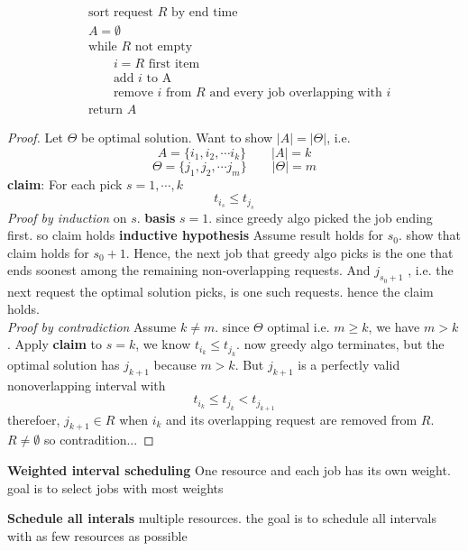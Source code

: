 \documentclass[11pt]{article}
\begin{document}
\begin{example}
\begin{solution}
    \begin{align*}
      &\text{sort request $R$ by end time}\\
      &A = \emptyset\\
      &\text{while $R$ not empty}\\
      &\quad\quad i = R \text{ first item } \\
      &\quad\quad \text{add $i$ to A} \\
      &\quad\quad \text{remove $i$ from $R$ and every job overlapping with $i$}\\
      &\text{return } A
    \end{align*}
    \begin{proof}
      Let $\Theta$ be optimal solution. Want to show $|A| = |\Theta|$, i.e.
      \[
        A = \{ i_1, i_2, \cdots i_k\} \quad \quad |A| = k
      \]
      \[
        \Theta = \{ j_1, j_2, \cdots j_m\} \quad \quad |\Theta| = m
      \]
      \textbf{claim}: For each pick $s = 1, \cdots, k$
      \[
        t_{i_s} \leq t_{j_s}
      \]
      \textit{Proof by induction} on $s$. \textbf{basis} $s=1$. since greedy algo picked the job ending first. so claim holds \textbf{inductive hypothesis} Assume result holds for $s_0$. show that claim holds for $s_0 + 1$. Hence, the next job that greedy algo picks is the one that ends soonest among the remaining non-overlapping requests. And $j_{s_0+1}$ , i.e. the next request the optimal solution picks, is one such requests. hence the claim holds. \\
      \textit{Proof by contradiction} Assume $k\neq m$. since $\Theta$ optimal i.e. $m \geq k$, we have $m>k$. Apply \textbf{claim} to $s=k$, we know $t_{i_k} \leq t_{j_k}$. now greedy algo terminates, but the optimal solution has $j_{k+1}$ because $m>k$. But $j_{k+1}$ is a perfectly valid nonoverlapping interval with
      \[
        t_{i_{k}} \leq t_{j_{k}} < t_{j_{k+1}}
      \]
      therefoer, $j_{k+1}\in R$ when $i_k$ and its overlapping request are removed from $R$. $R\neq \emptyset$ so contradition...
    \end{proof}
  \end{solution}
\end{example}


\begin{example}
  \textbf{Weighted interval scheduling} One resource and each job has its own weight. goal is to select jobs with most weights\\
\end{example}

\begin{example}
  \textbf{Schedule all interals} multiple resources. the goal is to schedule all intervals with as few resources as possible
\end{example}
\end{document}
